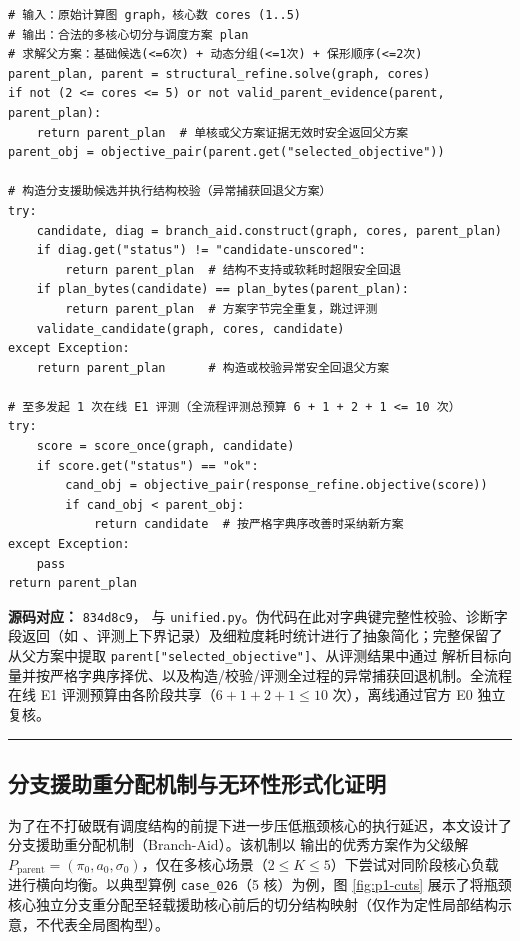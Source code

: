 \documentclass[anonymous,withtoc]{gmcm2026}
\begin{document}
\begin{lstlisting}[style=paperpseudo]
# 输入：原始计算图 graph，核心数 cores (1..5)
# 输出：合法的多核心切分与调度方案 plan
# 求解父方案：基础候选(<=6次) + 动态分组(<=1次) + 保形顺序(<=2次)
parent_plan, parent = structural_refine.solve(graph, cores)
if not (2 <= cores <= 5) or not valid_parent_evidence(parent, parent_plan):
    return parent_plan  # 单核或父方案证据无效时安全返回父方案
parent_obj = objective_pair(parent.get("selected_objective"))

# 构造分支援助候选并执行结构校验（异常捕获回退父方案）
try:
    candidate, diag = branch_aid.construct(graph, cores, parent_plan)
    if diag.get("status") != "candidate-unscored":
        return parent_plan  # 结构不支持或软耗时超限安全回退
    if plan_bytes(candidate) == plan_bytes(parent_plan):
        return parent_plan  # 方案字节完全重复，跳过评测
    validate_candidate(graph, cores, candidate)
except Exception:
    return parent_plan      # 构造或校验异常安全回退父方案

# 至多发起 1 次在线 E1 评测（全流程评测总预算 6 + 1 + 2 + 1 <= 10 次）
try:
    score = score_once(graph, candidate)
    if score.get("status") == "ok":
        cand_obj = objective_pair(response_refine.objective(score))
        if cand_obj < parent_obj:
            return candidate  # 按严格字典序改善时采纳新方案
except Exception:
    pass
return parent_plan
\end{lstlisting}
\textbf{源码对应：} \texttt{834d8c9}，\texttt{} 与 \texttt{unified.py}。伪代码在此对字典键完整性校验、诊断字段返回（如 \texttt{}、评测上下界记录）及细粒度耗时统计进行了抽象简化；完整保留了从父方案中提取 \texttt{parent{[}"selected\_objective"{]}}、从评测结果中通过 \texttt{} 解析目标向量并按严格字典序择优、以及构造/校验/评测全过程的异常捕获回退机制。全流程在线 E1 评测预算由各阶段共享（\(6 + 1 + 2 + 1 \le 10\) 次），离线通过官方 E0 独立复核。

\par\hrule\endgroup

\subsection{分支援助重分配机制与无环性形式化证明}

为了在不打破既有调度结构的前提下进一步压低瓶颈核心的执行延迟，本文设计了分支援助重分配机制（Branch-Aid）。该机制以 \texttt{} 输出的优秀方案作为父级解 \(P_{\mathrm{parent}} = (\pi_0, a_0, \sigma_0)\)，仅在多核心场景（\(2 \le K \le 5\)）下尝试对同阶段核心负载进行横向均衡。以典型算例 \texttt{case\_026}（5 核）为例，图 \ref{fig:p1-cuts} 展示了将瓶颈核心独立分支重分配至轻载援助核心前后的切分结构映射（仅作为定性局部结构示意，不代表全局图构型）。
\end{document}
